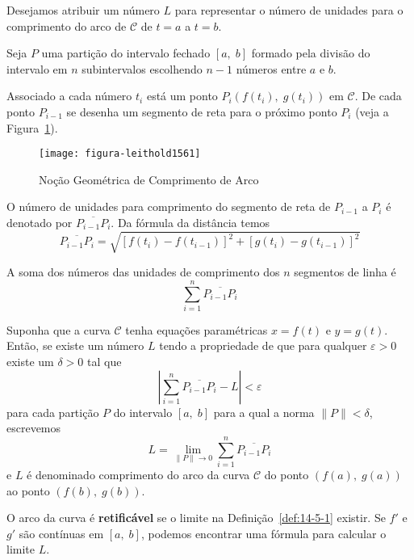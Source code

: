 Desejamos atribuir um número \(L\) para representar o número de unidades para o comprimento do arco de \( \mathcal{C}\) de \(t = a\) a \(t = b\).

Seja \(P\)  uma partição do intervalo fechado \([a,\; b]\) formado pela divisão do intervalo em \(n\) subintervalos escolhendo \(n-1\) números entre \(a\) e \(b\).

Associado a cada número \(t_{i}\) está um ponto \(P_{i}(f(t_{i}),\; g(t_{i}))\) em \( \mathcal{C}\). De cada ponto \(P_{i-1}\) se desenha um segmento
de reta para o próximo ponto \(P_{i}\) (veja a Figura~\ref{fig:1561}).
\begin{figure}[!h]
  \centering
  \texttt{[image: figura-leithold1561]}
  \caption{Noção Geométrica de Comprimento de Arco}\label{fig:1561}
\end{figure}

O número de unidades para comprimento do segmento de reta de \(P_{i-1}\) a \(P_{i}\) é denotado por \(\overline{P_{i-1}P_{i}}\). Da fórmula da distância temos
\begin{equation*}
\overline{P_{i-1}P_{i}}=\sqrt{[f(t_{i})-f(t_{i-1})]^{2}+[g(t_{i})-g(t_{i-1})]^{2}}
\end{equation*}

A soma dos números das unidades de comprimento dos $n$ segmentos de linha é
\begin{equation*}
  \sum_{i=1}^{n}\overline{P_{i-1}P_{i}}
\end{equation*}


\begin{defi}\label{def:14-5-1}
	Suponha que a curva \( \mathcal{C}\) tenha equações paramétricas \(x = f (t)\) e \(y = g (t)\). Então, se existe um número \(L\) tendo a propriedade de que para qualquer \(\varepsilon > 0\) existe um \( \delta> 0\) tal que
	\begin{equation*}
		\left|\sum_{i=1}^{n}\overline{P_{i-1}P_{i}}- L \right| < \varepsilon
	\end{equation*}
	para cada partição \(P\) do intervalo \([a,\; b]\) para a qual a norma \(\|{P}\| <\delta\), escrevemos
	\begin{equation*}
		L=\lim_{\|{P}\| \to 0}\sum_{i=1}^{n}\overline{P_{i-1}P_{i}}
	\end{equation*}
	e \(L\) é denominado comprimento do arco da curva \(\mathcal{C}\) do ponto \((f(a),\; g (a))\) ao ponto
	\((f(b),\; g (b))\).
\end{defi}

O arco da curva é \textbf{retificável} se o limite na Definição~\ref{def:14-5-1} existir. Se \(f'\) e \(g'\) são contínuas em \([a,\; b]\), podemos
encontrar uma fórmula para calcular o limite \(L\).

